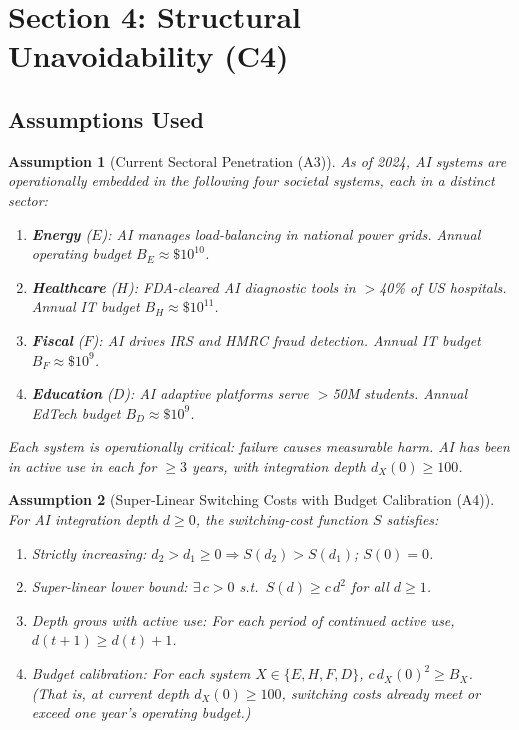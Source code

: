 \documentclass[12pt]{article}
\newtheorem{assumption}{Assumption}
\begin{document}
\section*{Section 4: Structural Unavoidability (C4)}

\subsection*{Assumptions Used}

\begin{assumption}[Current Sectoral Penetration (A3)]\label{A3}
  As of 2024, AI systems are operationally embedded in the following four
  societal systems, each in a distinct sector:
  \begin{enumerate}
    \item \textbf{Energy} ($E$): AI manages load-balancing in national
      power grids.  Annual operating budget $B_E \approx \$10^{10}$.
    \item \textbf{Healthcare} ($H$): FDA-cleared AI diagnostic tools in
      $>$40\% of US hospitals.  Annual IT budget $B_H \approx \$10^{11}$.
    \item \textbf{Fiscal} ($F$): AI drives IRS and HMRC fraud detection.
      Annual IT budget $B_F \approx \$10^{9}$.
    \item \textbf{Education} ($D$): AI adaptive platforms serve
      $>$50M students.  Annual EdTech budget $B_D \approx \$10^{9}$.
  \end{enumerate}
  Each system is operationally critical: failure causes measurable harm.
  AI has been in active use in each for $\geq 3$ years, with integration
  depth $d_X(0) \geq 100$.
\end{assumption}

\begin{assumption}[Super-Linear Switching Costs with Budget Calibration (A4)]\label{A4}
  For AI integration depth $d \geq 0$, the switching-cost function $S$
  satisfies:
  \begin{enumerate}
    \item \emph{Strictly increasing:} $d_2 > d_1 \geq 0 \Rightarrow S(d_2) > S(d_1)$;
      $S(0) = 0$.
    \item \emph{Super-linear lower bound:} $\exists\, c > 0$ s.t.\
      $S(d) \geq c\,d^2$ for all $d \geq 1$.
    \item \emph{Depth grows with active use:} For each period of
      continued active use, $d(t+1) \geq d(t) + 1$.
    \item \emph{Budget calibration:} For each system $X \in \{E,H,F,D\}$,
      $c\,d_X(0)^2 \geq B_X$.  (That is, at current depth $d_X(0) \geq 100$,
      switching costs already meet or exceed one year's operating budget.)
  \end{enumerate}
\end{assumption}
\end{document}
